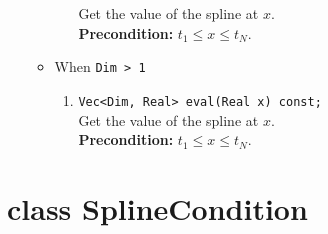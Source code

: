 \documentclass[12pt]{article}
\begin{document}
\begin{itemize}
\begin{itemize}
\begin{enumerate}
                                  Get the value of the spline at \(x\). \\
                                  \textbf{Precondition:} \(t_1\le x\le t_N\).
                        \end{enumerate}
                  \item When \texttt{Dim > 1}
                        \begin{enumerate}
                            \item \texttt{Vec<Dim, Real> eval(Real x) const;} \\
                                  Get the value of the spline at \(x\). \\
                                  \textbf{Precondition:} \(t_1\le x\le t_N\).
                        \end{enumerate} 
              \end{itemize}
    \end{itemize}

\section{class SplineCondition}
\end{document}
